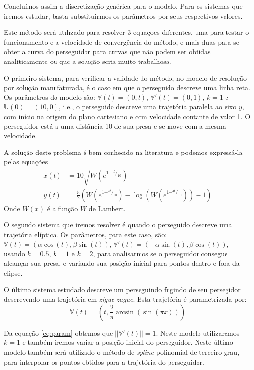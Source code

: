 \documentclass[a4paper,10pt]{article}
\begin{document}
  Concluímos assim a discretização genérica para o modelo. Para os sistemas que iremos estudar, basta substituirmos os parâmetros por seus respectivos valores.
  
  Este método será utilizado para resolver 3 equações diferentes, uma para testar o funcionamento e a velocidade de convergência do método, e mais duas para se obter a curva do perseguidor para curvas que não podem ser obtidas analiticamente ou que a solução seria muito trabalhosa. 
  
  O primeiro sistema, para verificar a validade do método, no modelo de resolução por solução manufaturada, é o caso em que o perseguido descreve uma linha reta. Os parâmetros do modelo são: $\mathbb{V}(t) = (0, t)$, $\mathbb{V}'(t) = (0, 1)$, $k = 1$ e $\mathbb{U}(0) = (10, 0)$, i.e., o perseguido descreve uma trajetória paralela ao eixo $y$, com início na origem do plano cartesiano e com velocidade contante de valor 1. O perseguidor está a uma distância 10 de sua presa e se move com a mesma velocidade.
  
  A solução deste problema é bem conhecido na literatura\cite{wolfram} e podemos expressá-la pelas equações
  \begin{align}
   x(t) &= 10\sqrt{W(e^{1 -^{4t}/_{10}})} \\
   y(t) &= \frac{5}{2}(W(e^{1 -^{4t}/_{10}}) - \log{(W(e^{1 -^{4t}/_{10}}))} - 1)   
  \end{align}
  Onde $W(x)$ é a função $W$ de Lambert.
  
  O segundo sistema que iremos resolver é quando o perseguido descreve uma trajetória elíptica. Os parâmetros, para este caso, são: $\mathbb{V}(t) = (\alpha \cos(t), \beta \sin(t))$, $\mathbb{V}'(t) = (-\alpha \sin(t), \beta \cos(t))$, usando $k = 0.5$, $k = 1$ e $k = 2$, para analisarmos se o perseguidor consegue alcançar sua presa, e variando sua posição inicial para pontos dentro e fora da elipse.
  
  O último sistema estudado descreve um perseguindo fugindo de seu persegidor descrevendo uma trajetória em \emph{zigue-zague}. Esta trajetória é parametrizada por:
  \begin{equation}
   \mathbb{V}(t) =
   (t, \frac{2}{\pi} \arcsin(\sin(\pi x)))
   \label{eq:param}
  \end{equation}
  
  Da equação \ref{eq:param} obtemos que $||\mathbb{V}'(t)|| = 1$. Neste modelo utilizaremos $k = 1$ e também iremos variar a posição inicial do perseguidor. Neste último modelo também será utilizado o método de \emph{spline} polinomial de terceiro grau, para interpolar os pontos obtidos para a trajetória do perseguidor.  
   
\end{document}
